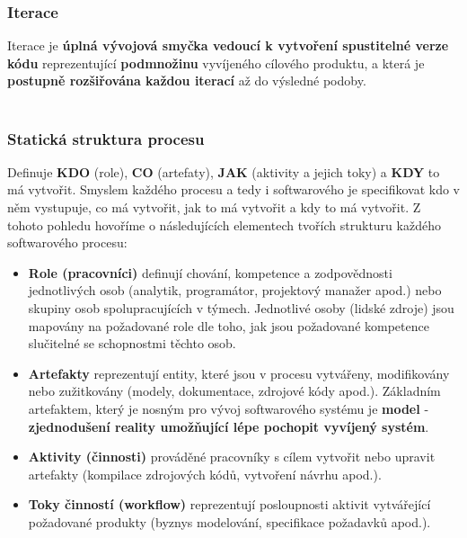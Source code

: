 \subsubsection{Iterace}
Iterace je \textbf{úplná vývojová smyčka vedoucí k vytvoření spustitelné verze kódu} reprezentující \textbf{podmnožinu} vyvíjeného cílového produktu, a která je \textbf{postupně rozšiřována každou iterací} až do výsledné podoby. 
\\\\
\noindent{}

\subsubsection{Statická struktura procesu}
Definuje \textbf{KDO} (role), \textbf{CO} (artefaty), \textbf{JAK} (aktivity a jejich toky) a \textbf{KDY} to má vytvořit. Smyslem každého procesu a tedy i softwarového je specifikovat kdo v něm vystupuje, co má vytvořit, jak to má vytvořit a kdy to má vytvořit.  Z tohoto pohledu hovoříme o následujících elementech tvořích strukturu každého softwarového procesu: 
\begin{itemize}
	\item \textbf{Role (pracovníci)} definují chování, kompetence a zodpovědnosti jednotlivých osob (analytik, programátor, projektový manažer apod.) nebo skupiny osob spolupracujících v týmech.  Jednotlivé osoby (lidské zdroje) jsou mapovány na požadované role dle toho, jak jsou požadované kompetence slučitelné se schopnostmi těchto osob.
\item \textbf{Artefakty} reprezentují entity, které jsou v procesu vytvářeny, modifikovány nebo zužitkovány (modely, dokumentace, zdrojové kódy apod.).  Základním artefaktem, který je nosným pro vývoj softwarového systému je \textbf{model} - \textbf{zjednodušení reality umožňující lépe pochopit vyvíjený systém}.
\item \textbf{Aktivity (činnosti)} prováděné pracovníky s cílem vytvořit nebo upravit artefakty (kompilace zdrojových kódů, vytvoření návrhu apod.).
\item \textbf{Toky činností (workflow)} reprezentují posloupnosti aktivit vytvářející požadované produkty (byznys modelování, specifikace požadavků apod.).
\end{itemize}

